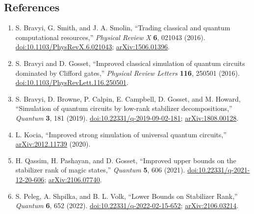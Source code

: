 \subsection*{References}

\begin{enumerate}[label={},leftmargin=4.8em,labelsep=0.5em]
  \footnotesize
  \item[\textup{[BSS16]}]\label{ref:srtk-bss16}
  S. Bravyi, G. Smith, and J. A. Smolin, ``Trading classical and quantum
  computational resources,'' \emph{Physical Review X} \textbf{6}, 021043
  (2016).
  \href{https://doi.org/10.1103/PhysRevX.6.021043}{doi:10.1103/PhysRevX.6.021043};
  \href{https://arxiv.org/abs/1506.01396}{arXiv:1506.01396}.

  \item[\textup{[BG16]}]\label{ref:srtk-bg16}
  S. Bravyi and D. Gosset, ``Improved classical simulation of quantum
  circuits dominated by Clifford gates,'' \emph{Physical Review Letters}
  \textbf{116}, 250501 (2016).
  \href{https://doi.org/10.1103/PhysRevLett.116.250501}{doi:10.1103/PhysRevLett.116.250501}.

  \item[\textup{[BBC+19]}]\label{ref:srtk-bbc19}
  S. Bravyi, D. Browne, P. Calpin, E. Campbell, D. Gosset, and M. Howard,
  ``Simulation of quantum circuits by low-rank stabilizer decompositions,''
  \emph{Quantum} \textbf{3}, 181 (2019).
  \href{https://doi.org/10.22331/q-2019-09-02-181}{doi:10.22331/q-2019-09-02-181};
  \href{https://arxiv.org/abs/1808.00128}{arXiv:1808.00128}.

  \item[\textup{[Koc20]}]\label{ref:srtk-koc20}
  L. Kocia, ``Improved strong simulation of universal quantum circuits,''
  \href{https://arxiv.org/abs/2012.11739}{arXiv:2012.11739} (2020).

  \item[\textup{[QPG21]}]\label{ref:srtk-qpg21}
  H. Qassim, H. Pashayan, and D. Gosset, ``Improved upper bounds on the
  stabilizer rank of magic states,'' \emph{Quantum} \textbf{5}, 606
  (2021).
  \href{https://doi.org/10.22331/q-2021-12-20-606}{doi:10.22331/q-2021-12-20-606};
  \href{https://arxiv.org/abs/2106.07740}{arXiv:2106.07740}.

  \item[\textup{[PSV22]}]\label{ref:srtk-psv22}
  S. Peleg, A. Shpilka, and B. L. Volk, ``Lower Bounds on Stabilizer
  Rank,'' \emph{Quantum} \textbf{6}, 652 (2022).
  \href{https://doi.org/10.22331/q-2022-02-15-652}{doi:10.22331/q-2022-02-15-652};
  \href{https://arxiv.org/abs/2106.03214}{arXiv:2106.03214}.


\end{enumerate}
